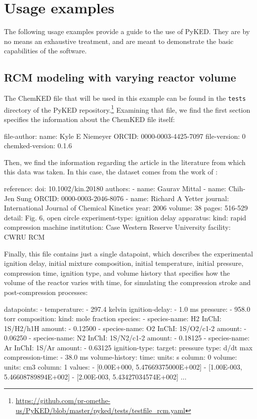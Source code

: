 \documentclass[12pt]{ijck}
\newcommand\ck{ChemKED}
\newcommand\pk{PyKED}
\begin{document}
\section{Usage examples}\label{sec:usage-example}

The following usage examples provide a guide to the use of \pk{}. They are by no
means an exhaustive treatment, and are meant to demonstrate the basic
capabilities of the software.

\subsection{RCM modeling with varying reactor volume}\label{sec:rcm-modeling}

The \ck{} file that will be used in this example can be found in the
\texttt{tests} directory of the PyKED
repository.\footnote{\url{https://github.com/pr-omethe-us/PyKED/blob/master/pyked/tests/testfile_rcm.yaml}}
Examining that file, we find the first section specifies the information about
the \ck{} file itself:
%
\begin{yamlbox}
file-author:
  name: Kyle E Niemeyer
  ORCID: 0000-0003-4425-7097
file-version: 0
chemked-version: 0.1.6
\end{yamlbox}
%
Then, we find the information regarding the article in the literature from which
this data was taken. In this case, the dataset comes from the work of
\textcite{Mittal2006a}:
\begin{yamlbox}
reference:
  doi: 10.1002/kin.20180
  authors:
    - name: Gaurav Mittal
    - name: Chih-Jen Sung
      ORCID: 0000-0003-2046-8076
    - name: Richard A Yetter
  journal: International Journal of Chemical Kinetics
  year: 2006
  volume: 38
  pages: 516-529
  detail: Fig. 6, open circle
experiment-type: ignition delay
apparatus:
  kind: rapid compression machine
  institution: Case Western Reserve University
  facility: CWRU RCM
\end{yamlbox}
%
Finally, this file contains just a single datapoint, which describes the experimental
ignition delay, initial mixture composition, initial temperature, initial pressure,
compression time, ignition type, and volume history that specifies
how the volume of the reactor varies with time, for simulating the compression
stroke and post-compression processes:
%
\begin{yamlbox}
datapoints:
- temperature:
    - 297.4 kelvin
  ignition-delay:
    - 1.0 ms
  pressure:
    - 958.0 torr
  composition:
    kind: mole fraction
    species:
      - species-name: H2
        InChI: 1S/H2/h1H
        amount:
          - 0.12500
      - species-name: O2
        InChI: 1S/O2/c1-2
        amount:
          - 0.06250
      - species-name: N2
        InChI: 1S/N2/c1-2
        amount:
          - 0.18125
      - species-name: Ar
        InChI: 1S/Ar
        amount:
          - 0.63125
  ignition-type:
    target: pressure
    type: d/dt max
  compression-time:
    - 38.0 ms
  volume-history:
    time:
      units: s
      column: 0
    volume:
      units: cm3
      column: 1
    values:
      - [0.00E+000, 5.47669375000E+002]
      - [1.00E-003, 5.46608789894E+002]
      - [2.00E-003, 5.43427034574E+002]
      ...
\end{yamlbox}
\end{document}
